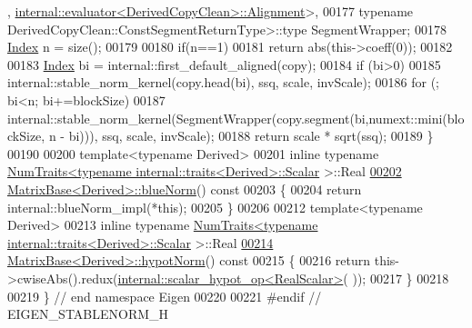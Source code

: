 \begin{DoxyCode}
      , \hyperlink{struct_eigen_1_1internal_1_1evaluator}{internal::evaluator<DerivedCopyClean>::Alignment}>,
00177                                                    \textcolor{keyword}{typename} DerivedCopyClean::ConstSegmentReturnType>::type
       SegmentWrapper;
00178   \hyperlink{namespace_eigen_a62e77e0933482dafde8fe197d9a2cfde}{Index} n = size();
00179   
00180   \textcolor{keywordflow}{if}(n==1)
00181     \textcolor{keywordflow}{return} abs(this->coeff(0));
00182   
00183   \hyperlink{namespace_eigen_a62e77e0933482dafde8fe197d9a2cfde}{Index} bi = internal::first\_default\_aligned(copy);
00184   \textcolor{keywordflow}{if} (bi>0)
00185     internal::stable\_norm\_kernel(copy.head(bi), ssq, scale, invScale);
00186   \textcolor{keywordflow}{for} (; bi<n; bi+=blockSize)
00187     internal::stable\_norm\_kernel(SegmentWrapper(copy.segment(bi,numext::mini(blockSize, n - bi))), ssq, 
      scale, invScale);
00188   \textcolor{keywordflow}{return} scale * sqrt(ssq);
00189 \}
00190 
00200 \textcolor{keyword}{template}<\textcolor{keyword}{typename} Derived>
00201 \textcolor{keyword}{inline} \textcolor{keyword}{typename} \hyperlink{group___core___module_struct_eigen_1_1_num_traits}{NumTraits<typename internal::traits<Derived>::Scalar}
      >::Real
\hyperlink{group___core___module_a3f3faa00163c16824ff03e58a210c74c}{00202} \hyperlink{group___core___module_a3f3faa00163c16824ff03e58a210c74c}{MatrixBase<Derived>::blueNorm}()\textcolor{keyword}{ const}
00203 \textcolor{keyword}{}\{
00204   \textcolor{keywordflow}{return} internal::blueNorm\_impl(*\textcolor{keyword}{this});
00205 \}
00206 
00212 \textcolor{keyword}{template}<\textcolor{keyword}{typename} Derived>
00213 \textcolor{keyword}{inline} \textcolor{keyword}{typename} \hyperlink{group___core___module_struct_eigen_1_1_num_traits}{NumTraits<typename internal::traits<Derived>::Scalar}
      >::Real
\hyperlink{group___core___module_a32222d3b6677e6cdf0b801463f329b72}{00214} \hyperlink{group___core___module_a32222d3b6677e6cdf0b801463f329b72}{MatrixBase<Derived>::hypotNorm}()\textcolor{keyword}{ const}
00215 \textcolor{keyword}{}\{
00216   \textcolor{keywordflow}{return} this->cwiseAbs().redux(\hyperlink{struct_eigen_1_1internal_1_1scalar__hypot__op}{internal::scalar\_hypot\_op<RealScalar>}(
      ));
00217 \}
00218 
00219 \} \textcolor{comment}{// end namespace Eigen}
00220 
00221 \textcolor{preprocessor}{#endif // EIGEN\_STABLENORM\_H}
\end{DoxyCode}
